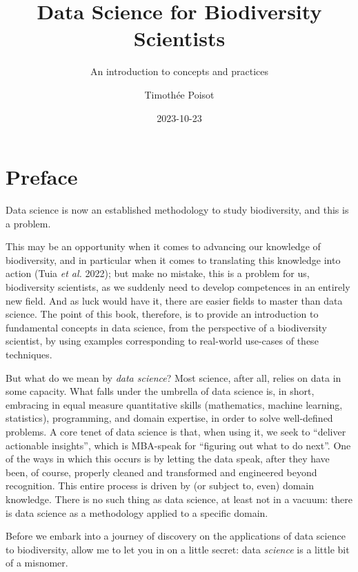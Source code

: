 \documentclass[
  letterpaper,
]{scrbook}
\title{Data Science for Biodiversity Scientists}
\subtitle{An introduction to concepts and practices}
\author{Timothée Poisot}
\date{2023-10-23}
\renewcommand*\contentsname{Table of contents}
\newcommand\contentsname{Table of contents}
\begin{document}
\frontmatter
\maketitle
\renewcommand*\contentsname{Table of contents}
{
\hypersetup{linkcolor=}
\setcounter{tocdepth}{1}
\tableofcontents
}
\mainmatter
{}

\chapter*{Preface}\label{preface}


Data science is now an established methodology to study biodiversity,
and this is a problem.

This may be an opportunity when it comes to advancing our knowledge of
biodiversity, and in particular when it comes to translating this
knowledge into action (Tuia \emph{et al.} 2022); but make no mistake,
this is a problem for us, biodiversity scientists, as we suddenly need
to develop competences in an entirely new field. And as luck would have
it, there are easier fields to master than data science. The point of
this book, therefore, is to provide an introduction to fundamental
concepts in data science, from the perspective of a biodiversity
scientist, by using examples corresponding to real-world use-cases of
these techniques.

But what do we mean by \emph{data science}? Most science, after all,
relies on data in some capacity. What falls under the umbrella of data
science is, in short, embracing in equal measure quantitative skills
(mathematics, machine learning, statistics), programming, and domain
expertise, in order to solve well-defined problems. A core tenet of data
science is that, when using it, we seek to ``deliver actionable
insights'', which is MBA-speak for ``figuring out what to do next''. One
of the ways in which this occurs is by letting the data speak, after
they have been, of course, properly cleaned and transformed and
engineered beyond recognition. This entire process is driven by (or
subject to, even) domain knowledge. There is no such thing as data
science, at least not in a vacuum: there is data science as a
methodology applied to a specific domain.

Before we embark into a journey of discovery on the applications of data
science to biodiversity, allow me to let you in on a little secret: data
\emph{science} is a little bit of a misnomer.
\end{document}
